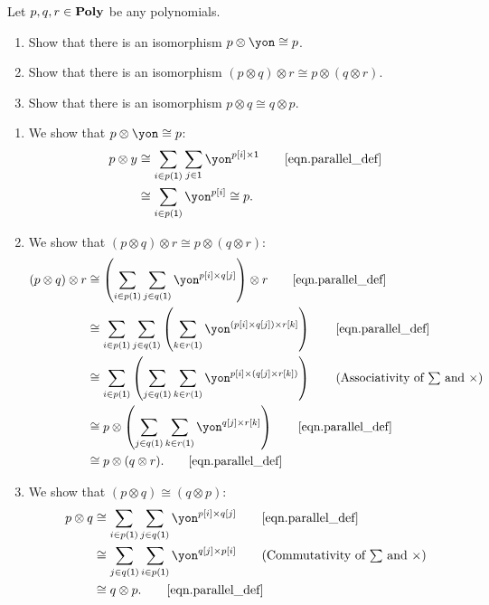 \documentclass[Book-Poly]{subfiles}
\begin{document}
\begin{exercise}\label{exc.prepare_poly_smc}
Let $p,q,r\in\mathbf{Poly}$ be any polynomials.
\begin{enumerate}
  \item Show that there is an isomorphism $p\otimes\yon\cong p$.
  \item Show that there is an isomorphism $(p\otimes q)\otimes r\cong p\otimes (q\otimes r)$.
  \item Show that there is an isomorphism $p\otimes q \cong q\otimes p$.
 \qedhere
\end{enumerate}
\begin{solution}
\begin{enumerate}
  \item We show that $p\otimes\yon\cong p$:
  \begin{align*}
      p \otimes y &\iso \sum_{i \in p(\1)} \sum_{j \in \1} \yon^{p[i] \times \1} \tag*{\eqref{eqn.parallel_def}} \\
      &\iso \sum_{i \in p(\1)} \yon^{p[i]} \iso p.
  \end{align*}

  \item We show that $(p\otimes q)\otimes r\cong p\otimes (q\otimes r)$:
  \begin{align*}
      (p \otimes q) \otimes r &\iso \left(\sum_{i \in p(\1)} \sum_{j \in q(\1)} \yon^{p[i] \times q[j]}\right) \otimes r \tag*{\eqref{eqn.parallel_def}} \\
      &\iso \sum_{i \in p(\1)} \sum_{j \in q(\1)} \left(\sum_{k \in r(\1)} \yon^{(p[i] \times q[j]) \times r[k]}\right) \tag*{\eqref{eqn.parallel_def}} \\
      &\iso \sum_{i \in p(\1)} \left(\sum_{j \in q(\1)} \sum_{k \in r(\1)} \yon^{p[i] \times (q[j] \times r[k])}\right) \tag{Associativity of $\sum$ and $\times$} \\
      &\iso p \otimes \left(\sum_{j \in q(\1)} \sum_{k \in r(\1)} \yon^{q[j] \times r[k]}\right) \tag*{\eqref{eqn.parallel_def}} \\
      &\iso p \otimes (q \otimes r). \tag*{\eqref{eqn.parallel_def}} \\
  \end{align*}

  \item We show that $(p\otimes q)\cong(q\otimes p)$:
  \begin{align*}
      p \otimes q &\iso \sum_{i \in p(\1)} \sum_{j \in q(\1)} \yon^{p[i] \times q[j]} \tag*{\eqref{eqn.parallel_def}} \\
      &\iso \sum_{j \in q(\1)} \sum_{i \in p(\1)} \yon^{q[j] \times p[i]} \tag{Commutativity of $\sum$ and $\times$} \\
      &\iso q \otimes p. \tag*{\eqref{eqn.parallel_def}} \\
  \end{align*}
\end{enumerate}
\end{solution}
\end{exercise}
\end{document}
